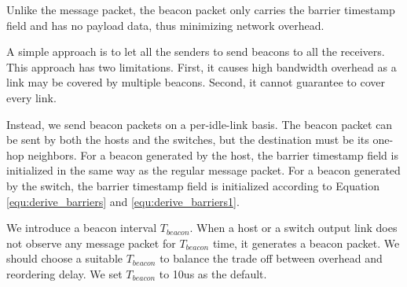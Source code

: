 Unlike the message packet, the beacon packet only carries the barrier timestamp field and has no payload data, thus minimizing network overhead. 

A simple approach is to let all the senders to send beacons to all the receivers. This approach has two limitations. First, it causes high bandwidth overhead as a link may be covered by multiple beacons. Second, it cannot guarantee to cover every link.

Instead, we send beacon packets on a per-idle-link basis.
The beacon packet can be sent by both the hosts and the switches,
but the destination must be its one-hop neighbors. For a beacon generated by the host, the barrier timestamp field is initialized in the same way as the regular message packet. For a beacon generated by the switch, the barrier timestamp field is initialized according to Equation \ref{equ:derive_barriers} and \ref{equ:derive_barriers1}.

We introduce a beacon interval $T_{beacon}$. When a host or a switch output link does not observe any message packet for $T_{beacon}$ time, it generates a beacon packet. We should choose a suitable $T_{beacon}$ to balance the trade off between overhead and reordering delay. We set $T_{beacon}$ to 10us as the default.





